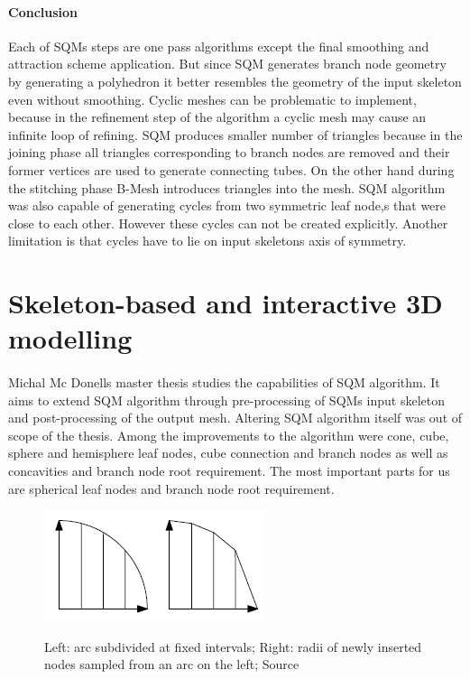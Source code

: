 \paragraph{Conclusion}
Each of SQMs steps are one pass algorithms except the final smoothing and attraction scheme application. But since SQM generates branch node geometry by generating a polyhedron it better resembles the geometry of the input skeleton even without smoothing. Cyclic meshes can be problematic to implement, because in the refinement step of the algorithm a cyclic mesh may cause an infinite loop of refining. SQM produces smaller number of triangles because in the joining phase all triangles corresponding to branch nodes are removed and their former vertices are used to generate connecting tubes. On the other hand during the stitching phase B-Mesh introduces triangles into the mesh. SQM algorithm was also capable of generating cycles from two symmetric leaf node,s that were close to each other. However these cycles can not be created explicitly. Another limitation is that cycles have to lie on input skeletons axis of symmetry.

\section{Skeleton-based and interactive 3D modelling} 
\paragraph{}
Michal Mc Donells master thesis studies the capabilities of SQM algorithm. It aims to extend SQM algorithm through pre-processing of SQMs input skeleton and post-processing of the output mesh. Altering SQM algorithm itself was out of scope of the thesis. Among the improvements to the algorithm were cone, cube, sphere and hemisphere leaf nodes, cube connection and branch nodes as well as concavities and branch node root requirement. The most important parts for us are spherical leaf nodes and branch node root requirement.

\begin{figure}[h]
    \centering
    \includegraphics[]{images/spherical_node.png}
    \label{fig:esqm_spherical}
    \caption[Spherical nodes radii]{Left: arc subdivided at fixed intervals; Right: radii of newly inserted nodes sampled from an arc on the left; Source \cite{sqm_phd}}
\end{figure}

